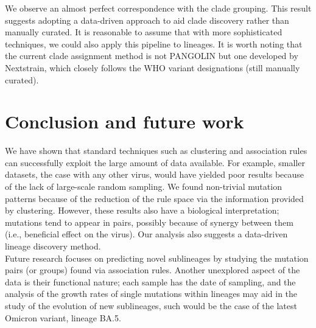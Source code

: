 \documentclass[twoside,twocolumn]{article}
\begin{document}
We observe an almost perfect correspondence with the clade grouping. This result suggests adopting a data-driven approach to aid clade discovery rather than manually curated. It is reasonable to assume that with more sophisticated techniques, we could also apply this pipeline to lineages. 
It is worth noting that the current clade assignment method is not PANGOLIN but one developed by Nextstrain\cite{cladeassignment}, which closely follows the WHO variant designations (still manually curated). 
\section{Conclusion and future work}
We have shown that standard techniques such as clustering and association rules can successfully exploit the large amount of data available. For example, smaller datasets, the case with any other virus, would have yielded poor results because of the lack of large-scale random sampling. We found non-trivial mutation patterns because of the reduction of the rule space via the information provided by clustering. However, these results also have a biological interpretation; mutations tend to appear in pairs, possibly because of synergy between them (i.e., beneficial effect on the virus). Our analysis also suggests a data-driven lineage discovery method. 	
\\
Future research focuses on predicting novel sublineages by studying the mutation pairs (or groups) found via association rules. Another unexplored aspect of the data is their functional nature; each sample has the date of sampling, and the analysis of the growth rates of single mutations within lineages may aid in the study of the evolution of new sublineages, such would be the case of the latest Omicron variant, lineage BA.5.
\newpage
\end{document}
